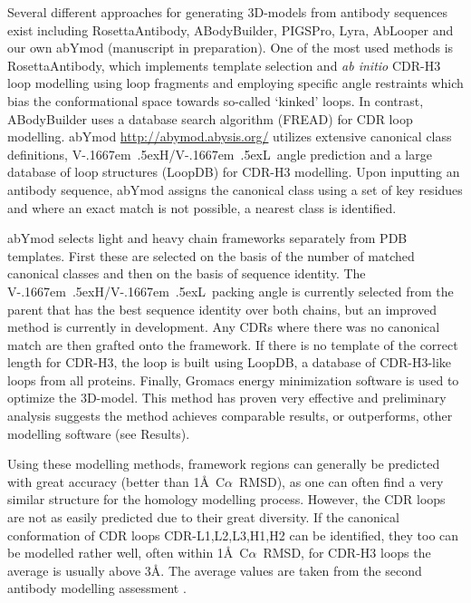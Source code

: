 \documentclass[12pt]{article}
\newcommand{\ca}{\mbox{C$\alpha$}}
\newcommand{\VH}{\mbox{V\kern-.1667em \lower.5ex\hbox{\scriptsize H}}}
\newcommand{\VL}{\mbox{V\kern-.1667em \lower.5ex\hbox{\scriptsize L}}}
\newcommand{\VHVL}{\mbox{\VH/\VL}}
\begin{document}
Several different approaches for generating 
3D-models from antibody sequences exist including
RosettaAntibody\cite{Sircar2009,Sivasubramanian2009}, 
ABodyBuilder\cite{Leem2016}, PIGSPro\cite{Lepore2017}, Lyra\cite{Klausen2015}, AbLooper\cite{Abanades2022} and our own abYmod (manuscript in preparation).
One of the most
used methods is RosettaAntibody, which implements template selection
and \emph{ab initio} CDR-H3 loop modelling using loop fragments and employing
specific angle restraints which bias the conformational space towards
so-called `kinked' loops\cite{Schoeder2021,Weitzner2017}. In
contrast, ABodyBuilder uses a database search algorithm
(FREAD\cite{Choi2010}) for CDR loop modelling.
abYmod \url{http://abymod.abysis.org/} utilizes extensive canonical
class definitions, \VHVL\ angle prediction and a large database of loop
structures (LoopDB) for CDR-H3 modelling.
Upon inputting an antibody sequence, abYmod assigns the
canonical class using a set of key residues\cite{Martin1996} and where
an exact match is not possible, a nearest class is identified.

abYmod selects light and heavy chain frameworks separately from PDB templates.
First these are selected on the basis of the number of matched
canonical classes and then on the basis of sequence identity.  The
\VHVL\ packing angle is currently selected from the parent that has
the best sequence identity over both chains, but an improved method is
currently in development. Any CDRs where there was no canonical match are then
grafted onto the framework. If there is no template of the correct
length for CDR-H3, the loop is built using LoopDB, a database of
CDR-H3-like loops from all proteins. Finally, Gromacs energy
minimization software is used to optimize the 3D-model. This method has
proven very effective and preliminary analysis suggests the method
achieves comparable results, or outperforms, other modelling software
(see Results).

Using these modelling methods, framework regions can
generally be predicted with great accuracy (better than 1\AA\
\ca~RMSD\cite{Almagro2014}), as one can often find a very similar
structure for the homology modelling process.  However, the CDR loops
are not as easily predicted due to their great diversity. If the
canonical conformation of CDR loops CDR-L1,L2,L3,H1,H2 can be identified, they too
can be modelled rather well, often within 1\AA\ \ca~RMSD, for CDR-H3 loops
the average is usually above 3\AA\cite{Almagro2011}. The average values are taken from the second antibody modelling assessment \cite{Almagro2014}.
\end{document}
